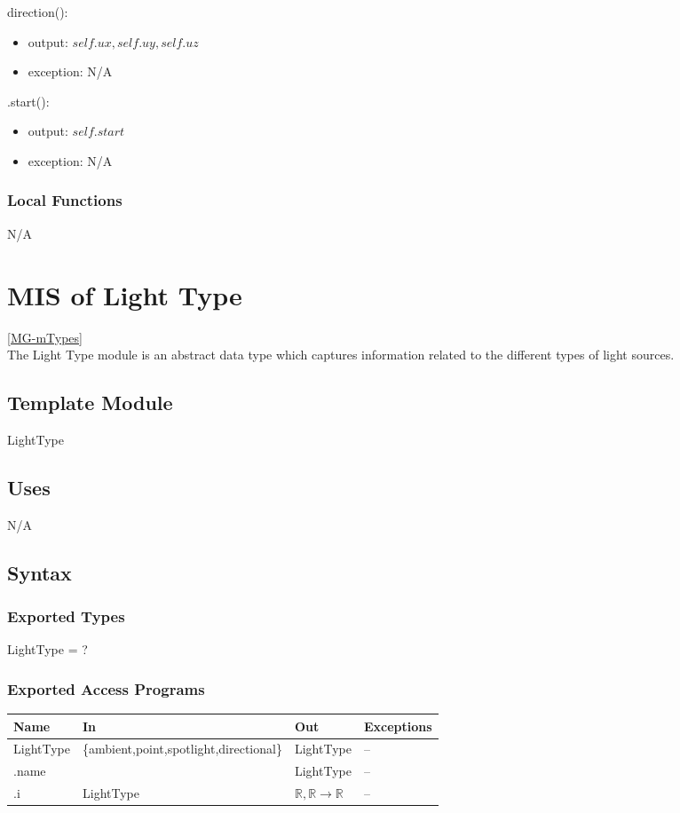 \documentclass[12pt, titlepage]{article}
\begin{document}
\noindent direction():
\begin{itemize}
	\item output: $self.ux, self.uy, self.uz$
	\item exception: N/A
\end{itemize}

\noindent .start():
\begin{itemize}
	\item output: $self.start$
	\item exception: N/A
\end{itemize}


\subsubsection{Local Functions}
N/A

\newpage

\section{MIS of Light Type} \ref{MG-mTypes} \\
The Light Type module is an abstract data type which captures information 
related to the different types of light sources.

\subsection{Template Module}
LightType

\subsection{Uses}
N/A

\subsection{Syntax}
\subsubsection{Exported Types}
LightType = ?
\subsubsection{Exported Access Programs}
\begin{center}
	\begin{tabular}{p{2cm} p{7cm} p{2cm} p{4cm}}
		\hline
		\textbf{Name} & \textbf{In} & \textbf{Out} & \textbf{Exceptions} \\
		\hline
		LightType & \{ambient,point,spotlight,directional\} & LightType & -- \\
		.name & & LightType & -- \\
		.i & LightType & $\mathbb{R},\mathbb{R} \to 
		\mathbb{R}$ & -- \\
		\hline
	\end{tabular}
\end{center}
\end{document}
